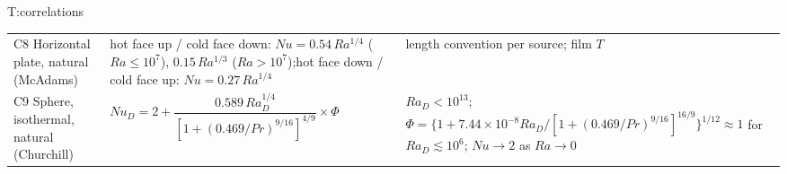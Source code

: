 \begin{reftab}{T:correlations}
\begin{tabularx}{\textwidth}{@{}L{0.21\textwidth}L{0.42\textwidth}Y@{}}
C8 Horizontal plate, natural (McAdams) & hot face up / cold face down: $Nu=0.54\,Ra^{1/4}$ ($Ra\le10^7$), $0.15\,Ra^{1/3}$ ($Ra>10^7$);\quad hot face down / cold face up: $Nu=0.27\,Ra^{1/4}$ & length convention per source; film $T$\label{F:conv:hplate}\\
C9 Sphere, isothermal, natural (Churchill) & $Nu_D=2+\dfrac{0.589\,Ra_D^{1/4}}{[1+(0.469/Pr)^{9/16}]^{4/9}}\times\Phi$ & $Ra_D<10^{13}$; $\Phi=\{1+7.44\times10^{-8}Ra_D/[1+(0.469/Pr)^{9/16}]^{16/9}\}^{1/12}\approx1$ for $Ra_D\lesssim10^6$; $Nu\to2$ as $Ra\to0$\\
\bottomrule
\end{tabularx}\end{reftab}
